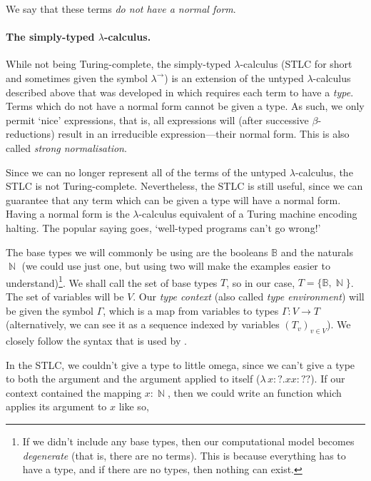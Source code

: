 \documentclass[logo,bsc,singlespacing,parskip,online]{infthesis}
\DeclareMathOperator{\nat}{\mathbb{N}}
\begin{document}
We say that these terms \textit{do not have a normal form}.

\paragraph*{The simply-typed $\lambda$-calculus.} While not being
Turing-complete, the simply-typed $\lambda$-calculus (STLC for short and
sometimes given the symbol $\lambda^{\rightarrow}$) is an extension of the
untyped $\lambda$-calculus described above that was developed in
\citet{church_formulation_1940} which requires each term to have a
\textit{type}. Terms which do not have a normal form cannot be given a type. As
such, we only permit `nice' expressions, that is, all expressions will (after
successive $\beta$-reductions) result in an irreducible expression---their
normal form. This is also called \textit{strong normalisation}.
\citep{pierce_types_2002}

Since we can no longer represent all of the terms of the untyped
$\lambda$-calculus, the STLC is not Turing-complete. Nevertheless, the STLC is
still useful, since we can guarantee that any term which can be given a type
will have a normal form. Having a normal form is the $\lambda$-calculus
equivalent of a Turing machine encoding halting. The popular saying goes,
`well-typed programs can't go wrong!' \citep{milner_theory_1978}

The base types we will commonly be using are the booleans $\mathbb{B}$ and the
naturals $\nat$ (we could use just one, but using two will make the examples
easier to understand)\footnote{If we didn't include any base types, then our
computational model becomes \textit{degenerate} (that is, there are no terms).
This is because everything has to have a type, and if there are no types, then
nothing can exist.}. We shall call the set of base types $T$, so in our case, $T
= \{ \mathbb{B} , \nat \}$. The set of variables will be $V$. Our \textit{type
context} (also called \textit{type environment}) will be given the symbol
$\Gamma$, which is a map from variables to types $\Gamma \colon V \to T$
(alternatively, we can see it as a sequence indexed by variables $(T_v)_{v \in
V}$). We closely follow the syntax that is used by \citet{pierce_types_2002}.

In the STLC, we couldn't give a type to little omega, since we can't give a type
to both the argument and the argument applied to itself ($\lambda \, x  \colon ?
. x x \colon ??$). If our context contained the mapping $x \colon \nat$, then we
could write an function which applies its argument to $x$ like so,
\end{document}
